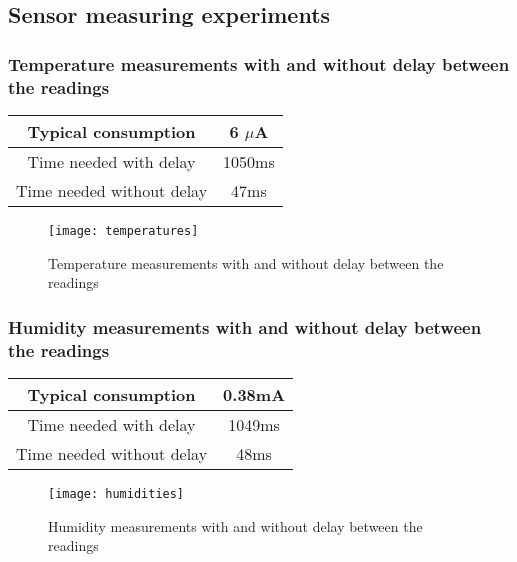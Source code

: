 \subsection{Sensor measuring experiments}
\label{sensMeasuring}
\subsubsection{Temperature measurements with and without delay between the readings}
\begin{table}[!hb]
\begin{center}
\begin{tabular}[!hb]{|c|c|}
\hline
Typical consumption  & 6 $\mu$A\\
\hline
Time needed with delay & 1050ms\\
\hline
Time needed without delay & 47ms\\
\hline
\end{tabular}
\label{tab:sleep1}
\end{center}
\end{table}
\begin{figure}[htbp]
\centering
\texttt{[image: temperatures]}
\caption{Temperature measurements with and without delay between the readings}
\label{fig:temperatures}
\end{figure} 
\vfill
\pagebreak
\subsubsection{Humidity measurements with and without delay between the readings}
\begin{table}[!hb]
\begin{center}
\begin{tabular}[!hb]{|c|c|}
\hline
Typical consumption  & 0.38mA\\
\hline
Time needed with delay & 1049ms\\
\hline
Time needed without delay & 48ms\\
\hline
\end{tabular}
\label{tab:sleep1}
\end{center}
\end{table}
\begin{figure}[htbp]
\centering
\texttt{[image: humidities]}
\caption{Humidity measurements with and without delay between the readings}
\label{fig:humidities}
\end{figure} 
\vfill
\pagebreak
